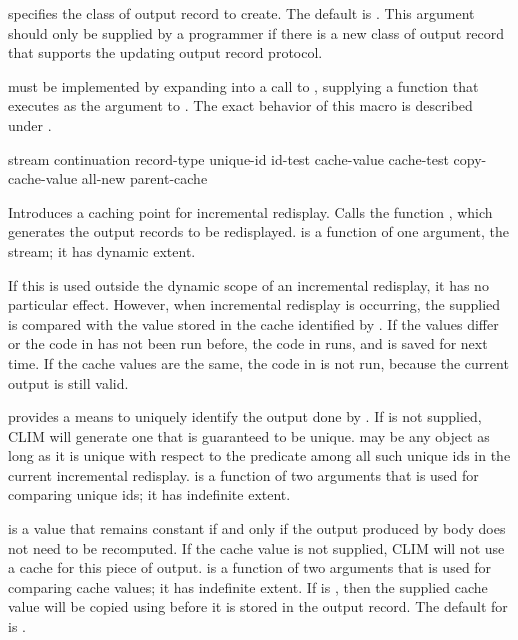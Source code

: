  specifies the class of output record to create.  The default
is .  This argument should only be supplied
by a programmer if there is a new class of output record that supports the
updating output record protocol.

 must be implemented by expanding into a call to
, supplying a function that executes  as
the  argument to .  The exact
behavior of this macro is described under .

 {stream continuation record-type
                                      unique-id id-test
                                      cache-value cache-test copy-cache-value
                                      \key all-new parent-cache}

Introduces a caching point for incremental redisplay.  Calls the function
, which generates the output records to be redisplayed.
 is a function of one argument, the stream; it has dynamic
extent.

If this is used outside the dynamic scope of an incremental redisplay, it has no
particular effect.  However, when incremental redisplay is occurring, the
supplied  is compared with the value stored in the cache
identified by .  If the values differ or the code in 
has not been run before, the code in  runs, and  is
saved for next time.  If the cache values are the same, the code in 
is not run, because the current output is still valid.

 provides a means to uniquely identify the output done by
.  If  is not supplied, CLIM will generate one that is
guaranteed to be unique.   may be any object as long as it is
unique with respect to the  predicate among all such unique ids in
the current incremental redisplay.   is a function of two arguments
that is used for comparing unique ids; it has indefinite extent.

 is a value that remains constant if and only if the output
produced by body does not need to be recomputed.  If the cache value is not
supplied, CLIM will not use a cache for this piece of output.  
is a function of two arguments that is used for comparing cache values; it has
indefinite extent.  If  is , then the supplied
cache value will be copied using  before it is stored in the output
record.  The default for  is .

